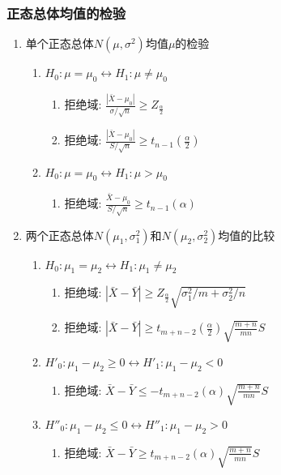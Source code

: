 \subsubsection{正态总体均值的检验}

\begin{enumerate}

\item 单个正态总体$N(\mu,\sigma^2)$均值$\mu$的检验
\begin{enumerate}
\item $H_0:\mu=\mu_0\leftrightarrow H_1:\mu\neq\mu_0$
\begin{enumerate}
\item 拒绝域: $\frac{|\bar{X}-\mu_0|}{\sigma/\sqrt{n}}\ge Z_{\frac{\alpha}{2}}$
\item 拒绝域: $\frac{|\bar{X}-\mu_0|}{S/\sqrt{n}}\ge t_{n-1}{(\frac{\alpha}{2})}$
\end{enumerate}
\item $H_0:\mu=\mu_0\leftrightarrow H_1:\mu>\mu_0$
\begin{enumerate}
\item 拒绝域: $\frac{\bar{X}-\mu_0}{S/\sqrt{n}} \ge t_{n-1}{(\alpha)}$
\end{enumerate}
\end{enumerate}

\item 两个正态总体$N(\mu_1,\sigma_1^2)$和$N(\mu_2,\sigma_2^2)$均值的比较
\begin{enumerate}
\item $H_0:\mu_1=\mu_2\leftrightarrow H_1:\mu_1\neq\mu_2$
\begin{enumerate}
\item 拒绝域: $|\bar{X}-\bar{Y}|\ge Z_{\frac{\alpha}{2}}\sqrt{\sigma_1^2/m+\sigma_2^2/n}$
\item 拒绝域: $|\bar{X}-\bar{Y}|\ge t_{m+n-2}{(\frac{\alpha}{2})}\sqrt{\frac{m+n}{mn}}S$
\end{enumerate}
\item $H'_0:\mu_1-\mu_2\ge0\leftrightarrow H'_1:\mu_1-\mu_2<0$
\begin{enumerate}
\item 拒绝域: $\bar{X}-\bar{Y}\le -t_{m+n-2}{(\alpha)}\sqrt{\frac{m+n}{mn}}S$
\end{enumerate}
\item $H''_0:\mu_1-\mu_2\le0\leftrightarrow H''_1:\mu_1-\mu_2>0$
\begin{enumerate}
\item 拒绝域: $\bar{X}-\bar{Y}\ge t_{m+n-2}{(\alpha)}\sqrt{\frac{m+n}{mn}}S$
\end{enumerate}
\end{enumerate}


\end{enumerate}
